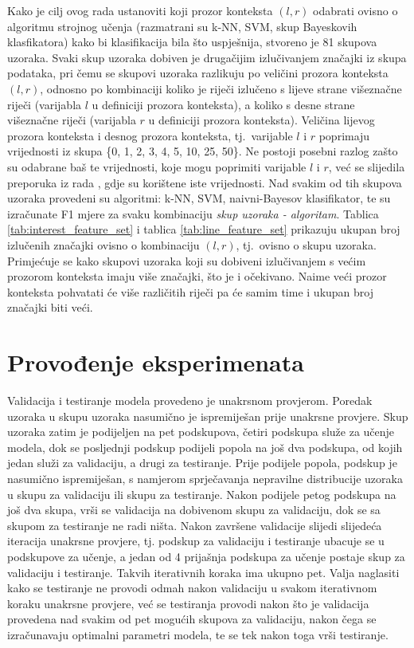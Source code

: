 \documentclass[10pt, a4paper]{article}
\begin{document}
Kako je cilj ovog rada ustanoviti koji prozor konteksta $(l,r)$ odabrati
ovisno o algoritmu strojnog učenja (razmatrani su k-NN, SVM, skup Bayeskovih klasfikatora)
kako bi klasifikacija bila što uspješnija, stvoreno je 81 skupova uzoraka. Svaki
skup uzoraka dobiven je drugačijim izlučivanjem značajki iz skupa podataka,
pri čemu se skupovi uzoraka razlikuju po veličini prozora konteksta $(l, r)$,
odnosno po kombinaciji koliko je riječi izlučeno s lijeve strane višeznačne riječi (varijabla $l$ u definiciji prozora konteksta), a koliko s desne strane višeznačne riječi (varijabla $r$ u definiciji prozora konteksta). Veličina lijevog prozora konteksta i desnog prozora konteksta, tj.~varijable
$l$ i $r$ poprimaju vrijednosti iz skupa \{0, 1, 2, 3, 4, 5, 10, 25, 50\}. Ne postoji posebni
razlog zašto su odabrane baš te vrijednosti, koje mogu poprimiti varijable $l$ i $r$,
već se slijedila preporuka iz rada \citep{pedersen}, gdje su korištene iste vrijednosti.
Nad svakim od tih skupova uzoraka provedeni su algoritmi: k-NN, SVM, naivni-Bayesov
klasifikator, te su izračunate F1 mjere za svaku kombinaciju \emph{skup uzoraka - algoritam}.
Tablica \ref{tab:interest_feature_set} i tablica \ref{tab:line_feature_set} prikazuju ukupan broj izlučenih značajki ovisno o kombinaciju $(l,r)$, tj.~ovisno o skupu uzoraka. Primjećuje
se kako skupovi uzoraka koji su dobiveni izlučivanjem s većim prozorom konteksta imaju
više značajki, što je i očekivano. Naime veći prozor konteksta pohvatati će više 
različitih riječi pa će samim time i ukupan broj značajki biti veći.

\section{Provođenje eksperimenata}
Validacija i testiranje modela provedeno je unakrsnom provjerom.
Poredak uzoraka u skupu uzoraka nasumično je ispremiješan prije
unakrsne provjere.
Skup uzoraka zatim je podijeljen na pet podskupova, četiri podskupa
služe za učenje modela, dok se posljednji podskup podijeli popola
na još dva podskupa, od kojih jedan služi za validaciju, a drugi za testiranje.
Prije podijele popola, podskup je nasumično ispremiješan, s
namjerom sprječavanja nepravilne distribucije uzoraka u skupu za validaciju
ili skupu za testiranje. Nakon podijele petog podskupa na još dva skupa,
vrši se validacija na dobivenom skupu za validaciju, dok se sa skupom za testiranje ne
radi ništa. Nakon završene validacije
slijedi slijedeća iteracija unakrsne provjere, tj. podskup za validaciju
i testiranje ubacuje se u podskupove za učenje, a jedan od 4 prijašnja podskupa
za učenje postaje skup za validaciju i testiranje. Takvih iterativnih koraka ima ukupno
pet. Valja naglasiti kako se testiranje ne provodi odmah nakon validaciju u svakom
iterativnom koraku unakrsne provjere, već se testiranja provodi nakon što je validacija
provedena nad svakim od pet mogućih skupova za validaciju, nakon čega se izračunavaju
optimalni parametri modela, te se tek nakon toga vrši testiranje. 
\end{document}

